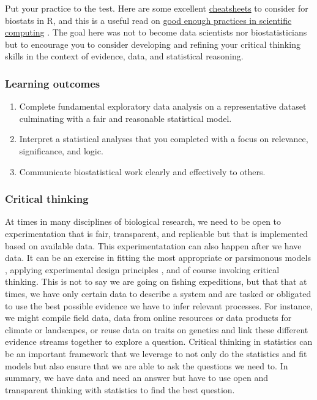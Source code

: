 \documentclass[
]{book}
\providecommand{\tightlist}{%
  \setlength{\itemsep}{0pt}\setlength{\parskip}{0pt}}
\begin{document}
Put your practice to the test. Here are some excellent \href{https://www.rstudio.com/resources/cheatsheets/}{cheatsheets} to consider for biostats in R, and this is a useful read on \href{https://arxiv.org/abs/1609.00037}{good enough practices in scientific computing} \citep{RN5002}. The goal here was not to become data scientists nor biostatisticians but to encourage you to consider developing and refining your critical thinking skills in the context of evidence, data, and statistical reasoning.

\hypertarget{learning-outcomes-6}{%
\subsubsection*{Learning outcomes}\label{learning-outcomes-6}}

\begin{enumerate}
\def\labelenumi{\arabic{enumi}.}
\tightlist
\item
  Complete fundamental exploratory data analysis on a representative dataset culminating with a fair and reasonable statistical model.\\
\item
  Interpret a statistical analyses that you completed with a focus on relevance, significance, and logic.\\
\item
  Communicate biostatistical work clearly and effectively to others.
\end{enumerate}

\hypertarget{critical-thinking-5}{%
\subsubsection*{Critical thinking}\label{critical-thinking-5}}

At times in many disciplines of biological research, we need to be open to experimentation that is fair, transparent, and replicable but that is implemented based on available data. This experimentatation can also happen after we have data. It can be an exercise in fitting the most appropriate or parsimonous models \citep{RN1873}, applying experimental design principles \citep{RN6381}, and of course invoking critical thinking. This is not to say we are going on fishing expeditions, but that that at times, we have only certain data to describe a system and are tasked or obligated to use the best possible evidence we have to infer relevant processes. For instance, we might compile field data, data from online resources or data products for climate or landscapes, or reuse data on traits on genetics and link these different evidence streams together to explore a question. Critical thinking in statistics can be an important framework that we leverage to not only do the statistics and fit models but also ensure that we are able to ask the questions we need to. In summary, we have data and need an answer but have to use open and transparent thinking with statistics to find the best question.
\end{document}
